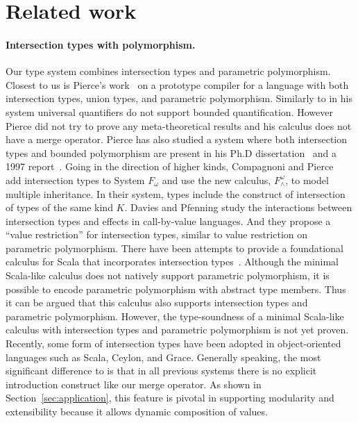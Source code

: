 \section{Related work} \label{sec:related-work}






\paragraph{Intersection types with polymorphism.}
Our type system combines intersection types and parametric polymorphism.  Closest
to us is Pierce's work~\cite{pierce1991programming1} on a prototype
compiler for a language with both intersection types, union types, and
parametric polymorphism. Similarly to \name in his system universal
quantifiers do not support bounded quantification. However Pierce did not try to prove any
meta-theoretical results and his calculus does not have a merge
operator.  Pierce has also studied a system where both intersection
types and bounded polymorphism are present in his Ph.D
dissertation~\cite{pierce1991programming2} and a 1997
report~\cite{pierce1997intersection}. Going in the direction of higher
kinds, Compagnoni and Pierce~\cite{compagnoni1996higher} add
intersection types to System $ F_{\omega} $ and use the new calculus,
$ F^{\omega}_{\wedge} $, to model multiple inheritance. In their
system, types include the construct of intersection of types of the
same kind $ K $. Davies and Pfenning
\cite{davies2000intersection} study the interactions between
intersection types and effects in call-by-value languages. And they
propose a ``value restriction'' for intersection types, similar to
value restriction on parametric polymorphism.
There have been attempts to provide a foundational calculus
for Scala that incorporates intersection
types~\cite{amin2014foundations,amin2012dependent}. 
Although the minimal Scala-like calculus does not natively support 
parametric polymorphism, it is possible to encode parametric
polymorphism with abstract type members. Thus it can be argued that 
this calculus also supports intersection types and parametric
polymorphism. However, the type-soundness of a minimal Scala-like 
calculus with intersection types and parametric polymorphism is not
yet proven. Recently, some form of intersection
types have been adopted in object-oriented languages such as Scala,
Ceylon, and Grace. Generally speaking,
the most significant difference to \name is that in all previous systems
there is no explicit introduction construct like our merge operator. As shown in
Section~\ref{sec:application}, this feature is pivotal in supporting modularity
and extensibility because it allows dynamic composition of values.

